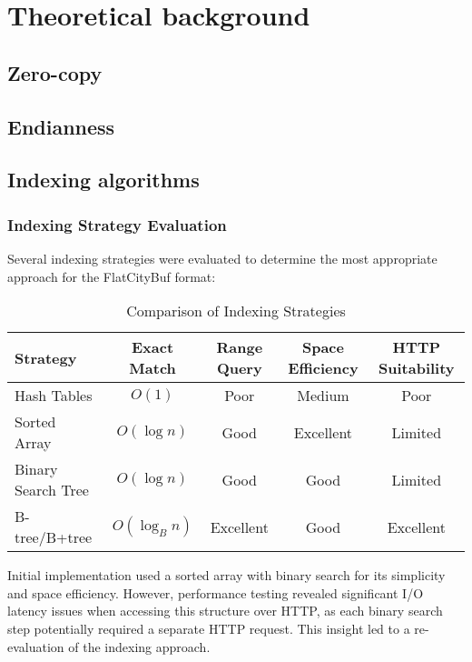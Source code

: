 \chapter{Theoretical background}
\label{chap:theoretical_background}


\section{Zero-copy}
\label{tb:zero_copy}

\section{Endianness}
\label{tb:endianness}

\section{Indexing algorithms}
\label{tb:indexing_algorithms}

\subsection{Indexing Strategy Evaluation}


Several indexing strategies were evaluated to determine the most appropriate approach for the FlatCityBuf format:

\begin{table}[ht]
    \centering
    \caption{Comparison of Indexing Strategies}
    \begin{tabular}{l|c|c|c|c}
        \hline
        \textbf{Strategy} & \textbf{Exact Match} & \textbf{Range Query} & \textbf{Space Efficiency} & \textbf{HTTP Suitability} \\
        \hline
        Hash Tables & $O(1)$ & Poor & Medium & Poor \\
        Sorted Array & $O(\log n)$ & Good & Excellent & Limited \\
        Binary Search Tree & $O(\log n)$ & Good & Good & Limited \\
        B-tree/B+tree & $O(\log_B n)$ & Excellent & Good & Excellent \\
        \hline
    \end{tabular}
    \label{tab:indexing_strategies}
\end{table}

Initial implementation used a sorted array with binary search for its simplicity and space efficiency. However, performance testing revealed significant I/O latency issues when accessing this structure over HTTP, as each binary search step potentially required a separate HTTP request. This insight led to a re-evaluation of the indexing approach.

